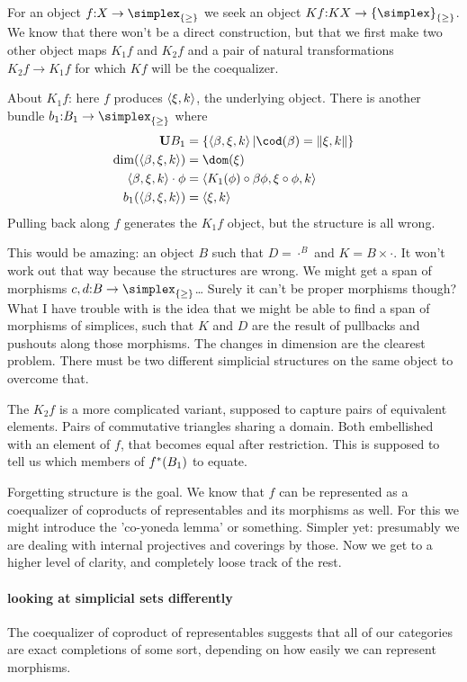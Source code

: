 \documentclass[csh.tex]{subfiles}
\begin{document}
For an object $f\of X \to \simplex_{\set\geq}$ we seek an object $Kf\of KX\to \set \simplex_{\set\geq}$. We know that there won't be a direct construction, but that we first make two other object maps $K_1f$ and $K_2f$ and a pair of natural transformations $K_2f\to K_1f$ for which $Kf$ will be the coequalizer.

About $K_1f$: here $f$ produces $\left\langle \xi,k \right\rangle$, the underlying object. There is another bundle $b_1\of B_1\to \simplex_{\set\geq}$ where 
\begin{align*}
\base B_1 &= \set{\tuplet{\beta,\xi,k}| \cod(\beta) = \norm{\xi ,k} }\\
\dim(\tuplet{\beta,\xi,k}) &= \dom(\xi) \\
\tuplet{\beta,\xi,k}\cdot\phi &= \tuplet{K_1(\phi)\circ \beta \phi,\xi\circ \phi,k} \\
b_1(\tuplet{\beta,\xi,k}) &= \tuplet{\xi,k}
\end{align*}
Pulling back along $f$ generates the $K_1f$ object, but the structure is all wrong.

This would be amazing: an object $B$ such that $D = \cdot^B$ and $K =B \times \cdot$.
It won't work out that way because the structures are wrong. We might get a span of morphisms $c,d\of B\to \simplex_{\set\geq}$\dots
Surely it can't be proper morphisms though? What I have trouble with is the idea that we might be able to find a span of morphisms of simplices,
such that $K$ and $D$ are the result of pullbacks and pushouts along those morphisms. The changes in dimension are the clearest problem.
There must be two different simplicial structures on the same object to overcome that. 

The $K_2f$ is a more complicated variant, supposed to capture pairs of equivalent elements. Pairs of commutative triangles sharing a domain. Both embellished with an element of $f$, that becomes equal after restriction. This is supposed to tell us which members of $f^*(B_1)$ to equate.

Forgetting structure is the goal. We know that $f$ can be represented as a coequalizer of coproducts of representables and its morphisms as well.
For this we might introduce the 'co-yoneda lemma' or something. Simpler yet: presumably we are dealing with internal projectives and coverings by those.
Now we get to a higher level of clarity, and completely loose track of the rest.

\paragraph{looking at simplicial sets differently}
The coequalizer of coproduct of representables suggests that all of our categories are exact completions of some sort, depending on how easily we can represent morphisms.
\end{document}
